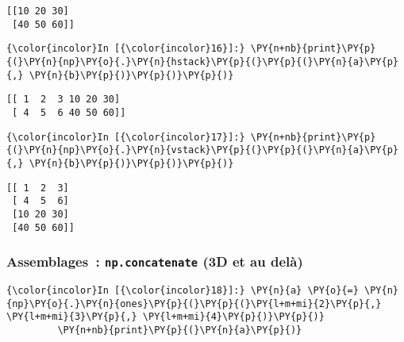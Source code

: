     \begin{Verbatim}[commandchars=\\\{\},frame=single,framerule=0.3mm,rulecolor=\color{cellframecolor}]
[[10 20 30]
 [40 50 60]]
\end{Verbatim}

    \begin{Verbatim}[commandchars=\\\{\},frame=single,framerule=0.3mm,rulecolor=\color{cellframecolor}]
{\color{incolor}In [{\color{incolor}16}]:} \PY{n+nb}{print}\PY{p}{(}\PY{n}{np}\PY{o}{.}\PY{n}{hstack}\PY{p}{(}\PY{p}{(}\PY{n}{a}\PY{p}{,} \PY{n}{b}\PY{p}{)}\PY{p}{)}\PY{p}{)}
\end{Verbatim}


    \begin{Verbatim}[commandchars=\\\{\},frame=single,framerule=0.3mm,rulecolor=\color{cellframecolor}]
[[ 1  2  3 10 20 30]
 [ 4  5  6 40 50 60]]
\end{Verbatim}

    \begin{Verbatim}[commandchars=\\\{\},frame=single,framerule=0.3mm,rulecolor=\color{cellframecolor}]
{\color{incolor}In [{\color{incolor}17}]:} \PY{n+nb}{print}\PY{p}{(}\PY{n}{np}\PY{o}{.}\PY{n}{vstack}\PY{p}{(}\PY{p}{(}\PY{n}{a}\PY{p}{,} \PY{n}{b}\PY{p}{)}\PY{p}{)}\PY{p}{)}
\end{Verbatim}


    \begin{Verbatim}[commandchars=\\\{\},frame=single,framerule=0.3mm,rulecolor=\color{cellframecolor}]
[[ 1  2  3]
 [ 4  5  6]
 [10 20 30]
 [40 50 60]]
\end{Verbatim}

    \hypertarget{assemblages-np.concatenate-3d-et-au-deluxe0}{%
\subsubsection{\texorpdfstring{Assemblages~: \texttt{np.concatenate} (3D
et au
delà)}{Assemblages~: np.concatenate (3D et au delà)}}\label{assemblages-np.concatenate-3d-et-au-deluxe0}}

    \begin{Verbatim}[commandchars=\\\{\},frame=single,framerule=0.3mm,rulecolor=\color{cellframecolor}]
{\color{incolor}In [{\color{incolor}18}]:} \PY{n}{a} \PY{o}{=} \PY{n}{np}\PY{o}{.}\PY{n}{ones}\PY{p}{(}\PY{p}{(}\PY{l+m+mi}{2}\PY{p}{,} \PY{l+m+mi}{3}\PY{p}{,} \PY{l+m+mi}{4}\PY{p}{)}\PY{p}{)}
         \PY{n+nb}{print}\PY{p}{(}\PY{n}{a}\PY{p}{)}
\end{Verbatim}


